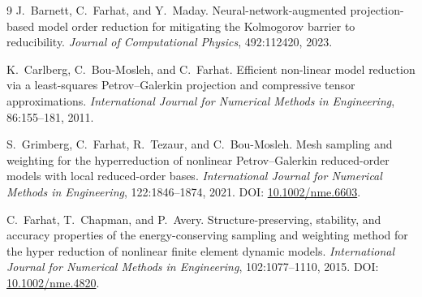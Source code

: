 \begin{thebibliography}{9}
J.~Barnett, C.~Farhat, and Y.~Maday.
Neural-network-augmented projection-based model order reduction for mitigating the Kolmogorov barrier to reducibility.
\textit{Journal of Computational Physics}, 492:112420, 2023.

K.~Carlberg, C.~Bou-Mosleh, and C.~Farhat.
Efficient non-linear model reduction via a least-squares Petrov--Galerkin projection and compressive tensor approximations.
\textit{International Journal for Numerical Methods in Engineering}, 86:155--181, 2011.

S.~Grimberg, C.~Farhat, R.~Tezaur, and C.~Bou-Mosleh.
Mesh sampling and weighting for the hyperreduction of nonlinear Petrov--Galerkin reduced-order models with local reduced-order bases.
\textit{International Journal for Numerical Methods in Engineering}, 122:1846--1874, 2021.
DOI: \href{https://doi.org/10.1002/nme.6603}{10.1002/nme.6603}.

C.~Farhat, T.~Chapman, and P.~Avery.
Structure-preserving, stability, and accuracy properties of the energy-conserving sampling and weighting method for the hyper reduction of nonlinear finite element dynamic models.
\textit{International Journal for Numerical Methods in Engineering}, 102:1077--1110, 2015.
DOI: \href{https://doi.org/10.1002/nme.4820}{10.1002/nme.4820}.
\end{thebibliography}
\endgroup
